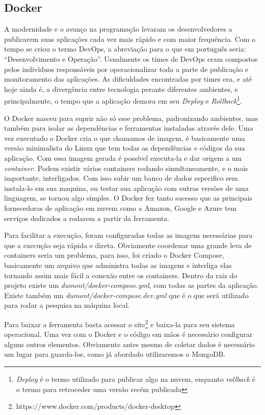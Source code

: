 \subsection{Docker}
A modernidade e o avanço na programação levaram os desenvolvedores a publicarem suas aplicações cada vez mais rápido e com maior frequência. Com o tempo se criou o termo DevOps, a abreviação para o que em português seria: “Desenvolvimento e Operação”. Usualmente os times de DevOps eram compostos pelos indivíduos responsáveis por operacionalizar toda a parte de publicação e monitoramento das aplicações. As dificuldades encontradas por times era, e até hoje ainda é, a divergência entre tecnologia perante diferentes ambientes, e principalmente, o tempo que a aplicação demora em seu \textit{Deploy} e \textit{Rollback}\footnote{\textit{Deploy} é o termo utilizado para publicar algo na nuvem, enquanto \textit{rollback} é o termo para retroceder uma versão recém publicada}.

O Docker nasceu para suprir não só esse problema, padronizando ambientes, mas também para isolar as dependências e ferramentas instaladas através dele. Uma vez executado o Docker cria o que chamamos de imagem, é basicamente uma versão minimalista do Linux que tem todas as dependências e códigos da sua aplicação. Com essa imagem gerada é possível executa-la e dar origem a um \textit{container}. Podem existir vários containers rodando simultaneamente, e o mais importante, interligados. Com isso subir um banco de dados especifico sem instala-lo em sua maquina, ou testar sua aplicação com outras versões de uma linguagem, se tornou algo simples. O Docker fez tanto sucesso que as principais fornecedoras de aplicação em nuvem como a Amazon, Google e Azure tem serviços dedicados a rodarem a partir da ferramenta.

Para facilitar a execução, foram configuradas todas as imagens necessárias para que a execução seja rápida e direta. Obviamente coordenar uma grande leva de containers seria um problema, para isso, foi criado o Docker Compose, basicamente um arquivo que administra todas as imagens e interliga elas tornando assim mais fácil a conexão entre os containers. Dentro da raiz do projeto existe um \textit{dumont/docker-compose.yml}, com todas as partes da aplicação. Existe também um \textit{dumont/docker-compose.dev.yml} que é o que será utilizado para rodar a pesquisa na máquina local.

Para baixar a ferramenta basta acessar o site\footnote{https://www.docker.com/products/docker-desktop} e baixa-la para seu sistema operacional. Uma vez com o Docker e o código em mãos é necessário configurar alguns outros elementos. Obviamente antes mesmo de coletar dados é necessário um lugar para guarda-los, como já abordado utilizaremos o MongoDB.

